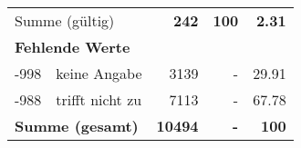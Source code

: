 \begin{longtable}{lXrrr}
     \midrule
     \multicolumn{2}{l}{Summe (gültig)} &
       \textbf{\num{242}} &
     \textbf{100} &
       \textbf{\num[round-mode=places,round-precision=2]{2,31}} \\
     \multicolumn{5}{l}{\textbf{Fehlende Werte}}\\
       -998 &
       keine Angabe &
         \num{3139} &
        - &
         \num[round-mode=places,round-precision=2]{29,91} \\
       -988 &
       trifft nicht zu &
         \num{7113} &
        - &
         \num[round-mode=places,round-precision=2]{67,78} \\
     \midrule
     \multicolumn{2}{l}{\textbf{Summe (gesamt)}} &
          \textbf{\num{10494}} &
        \textbf{-} &
        \textbf{100} \\
     \bottomrule
     \end{longtable}
     

